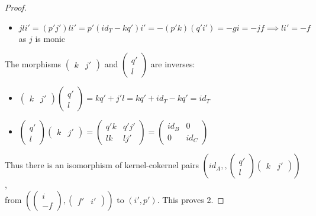 \begin{proof}
\begin{itemize}
            \item $jli'=(p'j')li'=p'(id_T-kq')i'=-(p'k)(q'i')=-gi=-jf \implies li'=-f$ as $j$ is monic
        \end{itemize}
        The morphisms $\begin{pmatrix}
            k & j'
        \end{pmatrix}$ and $\begin{pmatrix}
            q' \\ l
        \end{pmatrix}$ are inverses:
        \begin{itemize}
            \item $\begin{pmatrix}
                k & j'
            \end{pmatrix}\begin{pmatrix}
                q' \\ l
            \end{pmatrix}=kq'+j'l=kq'+id_T-kq'=id_T$
            \item $\begin{pmatrix}
                q' \\ l
            \end{pmatrix}\begin{pmatrix}
                k & j'
            \end{pmatrix}=\begin{pmatrix}
                q'k & q'j' \\ lk & lj'
            \end{pmatrix} = \begin{pmatrix}
                id_B & 0 \\ 0 & id_C
            \end{pmatrix}$
        \end{itemize}
        Thus there is an isomorphism of kernel-cokernel pairs $(id_A,,\begin{pmatrix}
            q' \\ l
        \end{pmatrix}\begin{pmatrix}
            k & j'
        \end{pmatrix})$, \\ from $(\begin{pmatrix}i \\ -f\end{pmatrix},\begin{pmatrix}f' & i'\end{pmatrix})$ to $(i',p')$. This proves 2.
    \end{proof}

